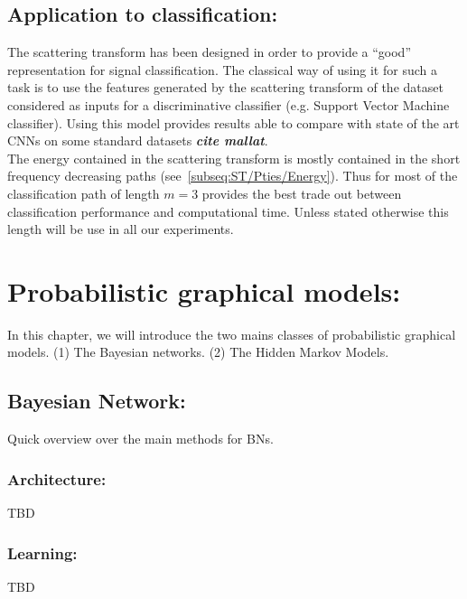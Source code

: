 \documentclass[a4paper,11pt]{report}
\begin{document}
{		
  \section{Application to classification:}
    \label{seq:ST/Applications to clf}
    
    The scattering transform has been designed in order to provide a ``good'' representation for signal classification. The classical way of using it for such a task is to use the features generated by the scattering transform of the dataset considered as inputs for a discriminative classifier (e.g. Support Vector Machine classifier). Using this model provides results able to compare with state of the art CNNs on some standard datasets \textbf{\textit{cite mallat}}. \\
    
    The energy contained in the scattering transform is mostly contained in the short frequency decreasing paths (see~\ref{subseq:ST/Pties/Energy}). Thus for most of the classification path of length $m=3$ provides the best trade out between classification performance and computational time. Unless stated otherwise this length will be use in all our experiments.
    
    
\chapter{Probabilistic graphical models:}
  \label{chap:PGMs}
  In this chapter, we will introduce the two mains classes of probabilistic graphical models. 
  (1) The Bayesian networks. 
  (2) The Hidden Markov Models.
	
  \section{Bayesian Network:}  
    \label{seq:PGMs/BN}
    Quick overview over the main methods for BNs.
    
    \subsection{Architecture:}
      \label{subseq:PGMs/BN/Architecture}
      TBD

    \subsection{Learning:}
      \label{subseq:PGMs/BN/Learning}
      TBD

}
\end{document}
